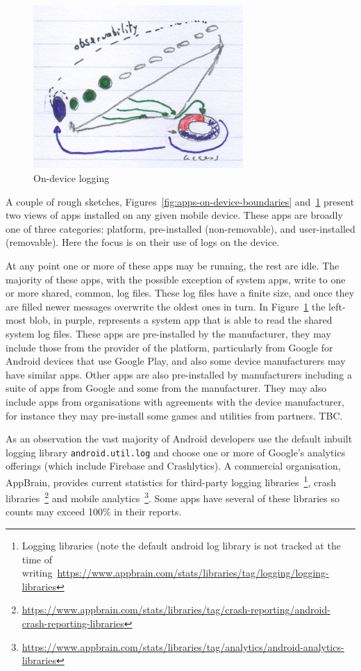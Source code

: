 \begin{figure}[htbp!]
    \centering
    \includegraphics[width=8cm]{images/rough-sketches/on-device-logging-sketch.jpeg}
    \caption{On-device logging}
    \label{fig:on-device-logging}
\end{figure}

A couple of rough sketches, Figures~\ref{fig:apps-on-device-boundaries} and~\ref{fig:on-device-logging} present two views of apps installed on any given mobile device. These apps are broadly one of three categories: platform, pre-installed (non-removable), and user-installed (removable). Here the focus is on their use of logs on the device.

At any point one or more of these apps may be running, the rest are idle. The majority of these apps, with the possible exception of system apps, write to one or more shared, common, log files. These log files have a finite size, and once they are filled newer messages overwrite the oldest ones in turn. In Figure~\ref{fig:on-device-logging} the left-most blob, in purple, represents a system app that is able to read the shared system log files. These apps are pre-installed by the manufacturer, they may include those from the provider of the platform, particularly from Google for Android devices that use Google Play, and also some device manufacturers may have similar apps. Other apps are also pre-installed by manufacturers including a suite of apps from Google and some from the manufacturer. They may also include apps from organisations with agreements with the device manufacturer, for instance they may pre-install some games and utilities from partners. TBC.


As an observation the vast majority of Android developers use the default inbuilt logging library \texttt{android.util.log} and choose one or more of Google's analytics offerings (which include Firebase and Crashlytics). A commercial organisation, AppBrain, provides current statistics for third-party logging libraries~\footnote{Logging libraries (note the default android log library is not tracked at the time of writing~\url{https://www.appbrain.com/stats/libraries/tag/logging/logging-libraries}}, crash libraries~\footnote{\url{https://www.appbrain.com/stats/libraries/tag/crash-reporting/android-crash-reporting-libraries}} and mobile analytics~\footnote{\url{https://www.appbrain.com/stats/libraries/tag/analytics/android-analytics-libraries}}. Some apps have several of these libraries so counts may exceed 100\% in their reports.

